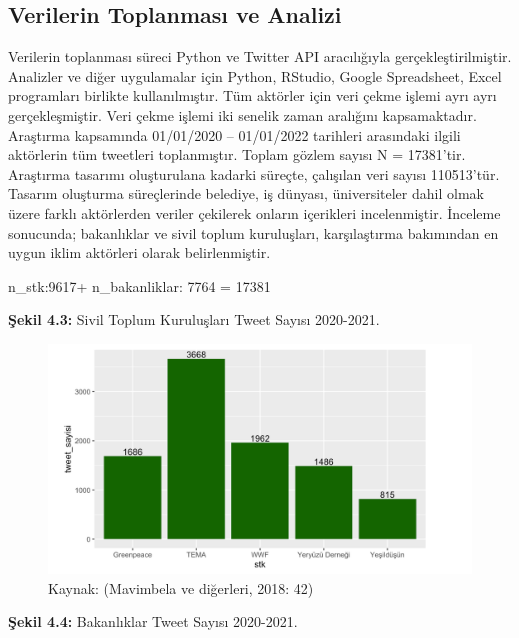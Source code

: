 \documentclass[
]{book}
\begin{document}
\hypertarget{verilerin-toplanmasux131-ve-analizi}{%
\subsection{Verilerin Toplanması ve Analizi}\label{verilerin-toplanmasux131-ve-analizi}}

Verilerin toplanması süreci Python ve Twitter API aracılığıyla gerçekleştirilmiştir. Analizler ve diğer uygulamalar için Python, RStudio, Google Spreadsheet, Excel programları birlikte kullanılmıştır. Tüm aktörler için veri çekme işlemi ayrı ayrı gerçekleşmiştir. Veri çekme işlemi iki senelik zaman aralığını kapsamaktadır. Araştırma kapsamında 01/01/2020 -- 01/01/2022 tarihleri arasındaki ilgili aktörlerin tüm tweetleri toplanmıştır. Toplam gözlem sayısı N = 17381'tir. Araştırma tasarımı oluşturulana kadarki süreçte, çalışılan veri sayısı 110513'tür. Tasarım oluşturma süreçlerinde belediye, iş dünyası, üniversiteler dahil olmak üzere farklı aktörlerden veriler çekilerek onların içerikleri incelenmiştir. İnceleme sonucunda; bakanlıklar ve sivil toplum kuruluşları, karşılaştırma bakımından en uygun iklim aktörleri olarak belirlenmiştir.

n\_stk:9617+ n\_bakanliklar: 7764 = 17381

\textbf{Şekil 4.3:} Sivil Toplum Kuruluşları Tweet Sayısı 2020-2021.

\begin{figure}
\includegraphics[width=0.95\linewidth,height=0.95\textheight]{tablolar-sekiller/sekil-4-3} \caption{Kaynak: (Mavimbela ve diğerleri, 2018: 42)}\label{fig:unnamed-chunk-4}
\end{figure}

\textbf{Şekil 4.4:} Bakanlıklar Tweet Sayısı 2020-2021.
\end{document}
